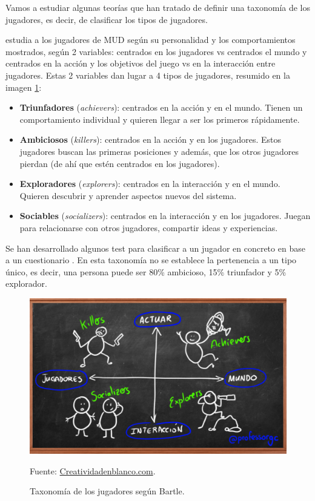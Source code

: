 Vamos a estudiar algunas teorías que han tratado de definir una taxonomía de los jugadores, es decir, de clasificar los tipos de jugadores.

 \cite{TypeMUD} estudia a los jugadores de \gls{MUD} según su personalidad y los comportamientos mostrados, según 2 variables: centrados en los jugadores vs centrados el mundo y centrados en la acción y los objetivos del juego vs en la interacción entre jugadores.
%
Estas 2 variables dan lugar a 4 tipos de jugadores, resumido en la imagen \ref{fig::Bartle}:
\begin{itemize}
	\item  \textbf{Triunfadores} (\textit{achievers}): centrados en la acción y en el mundo.
	Tienen un comportamiento individual y quieren llegar a ser los primeros rápidamente.
	

	\item \textbf{Ambiciosos} (\textit{killers}): centrados en la acción y en los jugadores. 
	Estos jugadores buscan las primeras posiciones y además, que los otros jugadores pierdan (de ahí que estén centrados en los jugadores).
	

	\item \textbf{Exploradores} (\textit{explorers}): centrados en la interacción y en el mundo.
	Quieren descubrir y aprender aspectos nuevos del sistema.

	\item \textbf{Sociables} (\textit{socializers}): centrados en la interacción y en los jugadores.
	Juegan para relacionarse con otros jugadores, compartir ideas y experiencias.
\end{itemize}

Se han desarrollado algunos test para clasificar a un jugador en concreto en base a un cuestionario  \cite{Bartletest}.
%
En esta taxonomía no se establece la pertenencia a un tipo único, es decir, una persona puede ser 80\% ambicioso, 15\% triunfador y 5\% explorador.


\begin{figure}[hbt]
\begin{center}
\includegraphics[scale=0.25]{img/Bartle.png}
\caption{Taxonomía de los jugadores según Bartle.}
\label{fig::Bartle}
\vspace{-0.25cm}
\small{Fuente: \url{Creatividadenblanco.com}.}
\end{center}
\end{figure}

